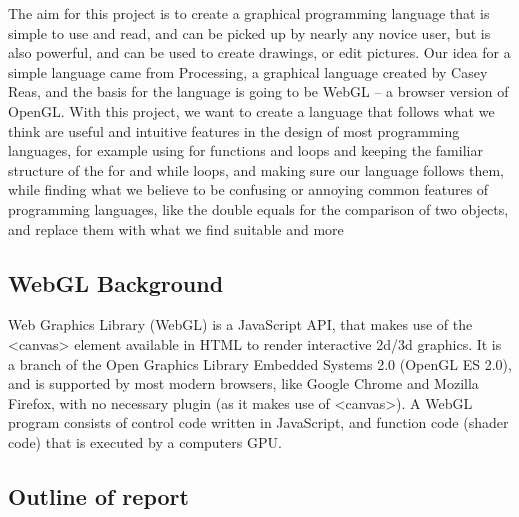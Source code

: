 \documentclass{l3proj}
\begin{document}
The aim for this project is to create a graphical programming language that is simple to use and read, and can be picked up by nearly any novice user, but is also powerful, and can be used to create drawings, or edit pictures. Our idea for a simple language came from Processing, a graphical language created by Casey Reas, and the basis for the language is going to be WebGL – a browser version of OpenGL. With this project, we want to create a language that follows what we think are useful and intuitive features in the design of most programming languages, for example using {} for functions and loops and keeping the familiar structure of the for and while loops, and making sure our language follows them, while finding what we believe to be confusing or annoying common features of programming languages, like the double equals for the comparison of two objects, and replace them with what we find suitable and more 

\subsection{WebGL Background}

Web Graphics Library (WebGL) is a JavaScript API, that makes use of the <canvas> element available in HTML to render interactive 2d/3d graphics. It is a branch of the Open Graphics Library Embedded Systems 2.0 (OpenGL ES 2.0), and is supported by most modern browsers, like Google Chrome and Mozilla Firefox, with no necessary plugin (as it makes use of <canvas>). A WebGL program consists of control code written in JavaScript, and function code (shader code) that is executed by a computers GPU. 

\subsection{Outline of report}
\end{document}
